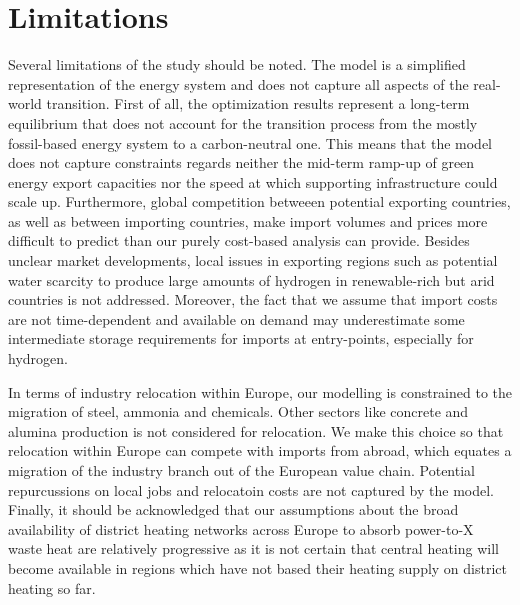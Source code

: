 
\section*{Limitations}

Several limitations of the study should be noted. The model is a simplified
representation of the energy system and does not capture all aspects of the
real-world transition. First of all, the optimization results represent a
long-term equilibrium that does not account for the transition process from the
mostly fossil-based energy system to a carbon-neutral one. This means that the
model does not capture constraints regards neither the mid-term ramp-up of green
energy export capacities nor the speed at which supporting infrastructure could
scale up. Furthermore, global competition betweeen potential exporting
countries, as well as between importing countries, make import volumes and
prices more difficult to predict than our purely cost-based analysis can
provide. Besides unclear market developments, local issues in exporting regions
such as potential water scarcity to produce large amounts of hydrogen in
renewable-rich but arid countries is not addressed. Moreover, the fact that we
assume that import costs are not time-dependent and available on demand may
underestimate some intermediate storage requirements for imports at
entry-points, especially for hydrogen.

In terms of industry relocation within Europe, our modelling is constrained to
the migration of steel, ammonia and chemicals. Other sectors like concrete and
alumina production is not considered for relocation. We make this choice so that
relocation within Europe can compete with imports from abroad, which equates a
migration of the industry branch out of the European value chain. Potential
repurcussions on local jobs and relocatoin costs are not captured by the model.
Finally, it should be acknowledged that our assumptions about the broad
availability of district heating networks across Europe to absorb
\mbox{power-to-X} waste heat are relatively progressive as it is not certain
that central heating will become available in regions which have not based their
heating supply on district heating so far.

\newpage
